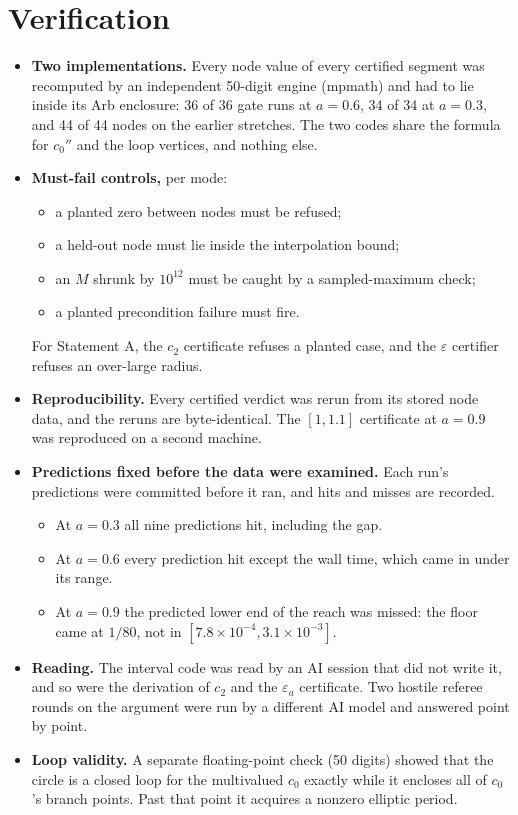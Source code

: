 \documentclass[11pt,a4paper]{article}
\begin{document}
\section{Verification}
\begin{itemize}
\item \textbf{Two implementations.} Every node value of every certified segment was recomputed by an independent
50-digit engine (mpmath) and had to lie inside its Arb enclosure: 36 of 36 gate runs at $a=0.6$, 34 of 34 at
$a=0.3$, and 44 of 44 nodes on the earlier stretches. The two codes share the formula for $c_0''$ and the loop
vertices, and nothing else.
\item \textbf{Must-fail controls,} per mode:
  \begin{itemize}
  \item a planted zero between nodes must be refused;
  \item a held-out node must lie inside the interpolation bound;
  \item an $M$ shrunk by $10^{12}$ must be caught by a sampled-maximum check;
  \item a planted precondition failure must fire.
  \end{itemize}
  For Statement A, the $c_2$ certificate refuses a planted case, and the $\varepsilon$ certifier refuses an
  over-large radius.
\item \textbf{Reproducibility.} Every certified verdict was rerun from its stored node data, and the reruns are
byte-identical. The $[1,1.1]$ certificate at $a=0.9$ was reproduced on a second machine.
\item \textbf{Predictions fixed before the data were examined.} Each run's predictions were committed before it ran,
and hits and misses are recorded.
  \begin{itemize}
  \item At $a=0.3$ all nine predictions hit, including the gap.
  \item At $a=0.6$ every prediction hit except the wall time, which came in under its range.
  \item At $a=0.9$ the predicted lower end of the reach was missed: the floor came at $1/80$, not in
$[7.8\times10^{-4},3.1\times10^{-3}]$.
  \end{itemize}
\item \textbf{Reading.} The interval code was read by an AI session that did not write it, and so were the
derivation of $c_2$ and the $\varepsilon_a$ certificate. Two hostile referee rounds on the argument were run by a
different AI model and answered point by point.
\item \textbf{Loop validity.} A separate floating-point check (50 digits) showed that the circle is a closed loop for the multivalued $c_0$
exactly while it encloses all of $c_0$'s branch points. Past that point it acquires a nonzero elliptic period.
\end{itemize}
\end{document}
